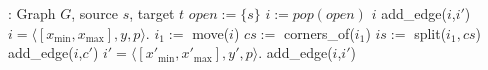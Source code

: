 \begin{algorithmic}
: Graph $G$, source $s$, target $t$
\STATE $open := \{s\}$
\LOOP
  \STATE $i := pop(open)$
     $i$
  \ENDIF
      \STATE add\_edge($i$,$i'$)
    \ENDFOR
  \ELSE %
     $i = \langle [x_{\min},x_{\max}],y,p\rangle$.
    \STATE $i_1 :=$ move($i$)
    \STATE $cs :=$ corners\_of($i_1$)
    \STATE $is :=$ split($i_1,cs$)
        \STATE add\_edge($i$,$c'$)
      \ENDIF
    \ENDFOR
       $i' = \langle [x'_{\min},x'_{\max}],y',p\rangle$.
        \STATE add\_edge($i$,$i'$)
      \ENDIF
    \ENDFOR
  \ENDIF
\ENDLOOP
\end{algorithmic}

